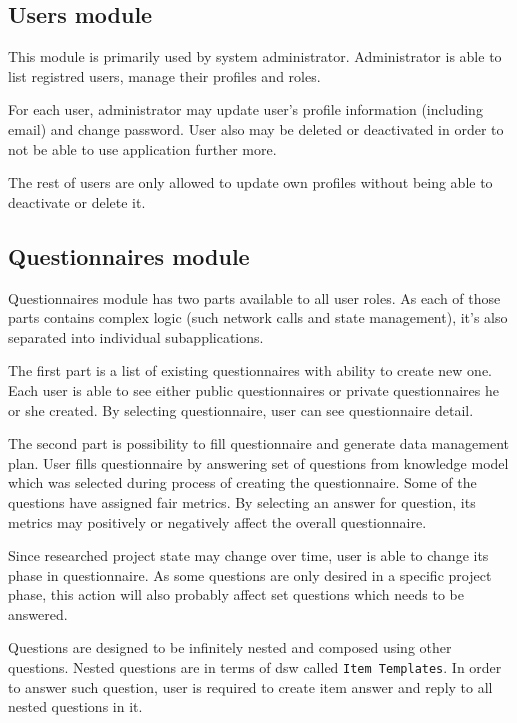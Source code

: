 \subsection{Users module}\label{sec:users-module}

This module is primarily used by system administrator.
Administrator is able to list registred users, manage their profiles and roles.

For each user, administrator may update user's profile information (including email) and change password.
User also may be deleted or deactivated in order to not be able to use application further more.

The rest of users are only allowed to update own profiles without being able to deactivate or delete it.

\subsection{Questionnaires module}\label{sec:questionnaires-module}

Questionnaires module has two parts available to all user roles.
As each of those parts contains complex logic (such network calls and state management), it's also separated into individual subapplications.

The first part is a list of existing questionnaires with ability to create new one.
Each user is able to see either public questionnaires or private questionnaires he or she created.
By selecting questionnaire, user can see questionnaire detail.

The second part is possibility to fill questionnaire and generate data management plan.
User fills questionnaire by answering set of questions from knowledge model which was selected during process of creating the questionnaire.
Some of the questions have assigned \gls{fair} metrics.
By selecting an answer for question, its metrics may positively or negatively affect the overall questionnaire.

Since researched project state may change over time, user is able to change its phase in questionnaire.
As some questions are only desired in a specific project phase, this action will also probably affect set questions which needs to be answered.

Questions are designed to be infinitely nested and composed using other questions.
Nested questions are in terms of \gls{dsw} called \texttt{Item Templates}.
In order to answer such question, user is required to create item answer and reply to all nested questions in it.


